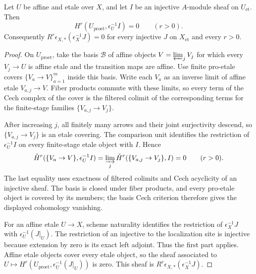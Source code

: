 \begin{lemma}
\label{lemma:weil-pbc-epsilon-injective-acyclicity}
\uses{}

Let $U$ be affine and etale over $X$, and let $I$ be an injective
$A$-module sheaf on $U_{\mathrm{et}}$.  Then
\[
 H^r(U_{\mathrm{proet}},\epsilon_U^{-1}I)=0\qquad(r>0).
\]
Consequently $R^r\epsilon_{X,*}(\epsilon_X^{-1}J)=0$ for every injective
$J$ on $X_{\mathrm{et}}$ and every $r>0$.
\end{lemma}
\begin{proof}

On $U_{\mathrm{proet}}$, take the basis $\mathcal B$ of affine objects
$V=\varprojlim_jV_j$ for which every $V_j\to U$ is affine etale and the
transition maps are affine.  Use finite pro-etale covers
$\{V_a\to V\}_{a=1}^m$ inside this basis.  Write each $V_a$ as an inverse
limit of affine etale $V_{a,j}\to V$.  Fiber products commute with these
limits, so every term of the Cech complex of the cover is the filtered colimit
of the corresponding terms for the finite-stage families
$\{V_{a,j}\to V_j\}$.

After increasing $j$, all finitely many arrows and their joint surjectivity
descend, so $\{V_{a,j}\to V_j\}$ is an etale covering.  The comparison unit
identifies the restriction of $\epsilon_U^{-1}I$ on every finite-stage etale
object with $I$.  Hence
\[
 \check H^r(\{V_a\to V\},\epsilon_U^{-1}I)
 =\varinjlim_j\check H^r(\{V_{a,j}\to V_j\},I)=0
 \qquad(r>0).
\]
The last equality uses exactness of filtered colimits and Cech acyclicity of
an injective sheaf.  The basis is closed under fiber products, and every
pro-etale object is covered by its members; the basis Cech criterion therefore
gives the displayed cohomology vanishing.

For an affine etale $U\to X$, scheme naturality identifies the restriction
of $\epsilon_X^{-1}J$ with $\epsilon_U^{-1}(J|_U)$.  The restriction of an
injective to the localization site is injective because extension by zero is
its exact left adjoint.  Thus the first part applies.  Affine etale objects
cover every etale object, so the sheaf associated to
$U\mapsto H^r(U_{\mathrm{proet}},\epsilon_U^{-1}(J|_U))$ is zero.  This sheaf
is $R^r\epsilon_{X,*}(\epsilon_X^{-1}J)$.
\end{proof}

